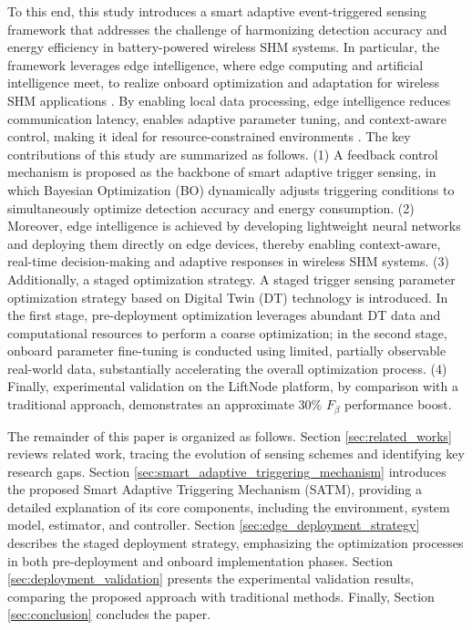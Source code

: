 \documentclass[a4paper,fleqn,numbers,sort&compress]{cas-sc}
\begin{document}
To this end, this study introduces a smart adaptive event-triggered sensing framework that addresses the challenge of harmonizing detection accuracy and energy efficiency in battery-powered wireless SHM systems. In particular, the framework leverages edge intelligence, where edge computing and artificial intelligence meet, to realize onboard optimization and adaptation for wireless SHM applications \citep{tu_distributed_2024}. By enabling local data processing, edge intelligence reduces communication latency, enables adaptive parameter tuning, and context-aware control, making it ideal for resource-constrained environments \citep{cui_adaptiveedgeintelligence_2025}. The key contributions of this study are summarized as follows. (1) A feedback control mechanism is proposed as the backbone of smart adaptive trigger sensing, in which Bayesian Optimization (BO) dynamically adjusts triggering conditions to simultaneously optimize detection accuracy and energy consumption. (2) Moreover, edge intelligence is achieved by developing lightweight neural networks and deploying them directly on edge devices, thereby enabling context-aware, real-time decision-making and adaptive responses in wireless SHM systems. (3) Additionally, a staged optimization strategy. A staged trigger sensing parameter optimization strategy based on Digital Twin (DT) technology is introduced. In the first stage, pre-deployment optimization leverages abundant DT data and computational resources to perform a coarse optimization; in the second stage, onboard parameter fine-tuning is conducted using limited, partially observable real-world data, substantially accelerating the overall optimization process. (4) Finally, experimental validation on the LiftNode platform, by comparison with a traditional approach, demonstrates an approximate 30\%  
$F_{\beta}$ performance boost.

The remainder of this paper is organized as follows. Section \ref{sec:related_works} reviews related work, tracing the evolution of sensing schemes and identifying key research gaps. Section \ref{sec:smart_adaptive_triggering_mechanism} introduces the proposed Smart Adaptive Triggering Mechanism (SATM), providing a detailed explanation of its core components, including the environment, system model, estimator, and controller. Section \ref{sec:edge_deployment_strategy} describes the staged deployment strategy, emphasizing the optimization processes in both pre-deployment and onboard implementation phases. Section \ref{sec:deployment_validation} presents the experimental validation results, comparing the proposed approach with traditional methods. Finally, Section \ref{sec:conclusion} concludes the paper. 
\end{document}

